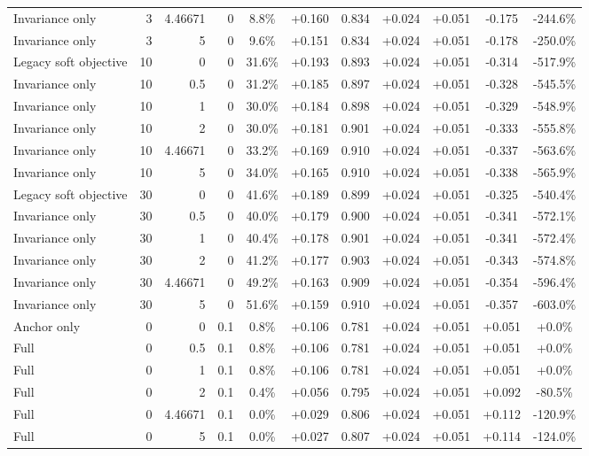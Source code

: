 \begin{table}[htbp]
\begin{tabular}{lrrrccccccc}
Invariance only & 3 & 4.46671 & 0 & 8.8\% & +0.160 & 0.834 & +0.024 & +0.051 & -0.175 & -244.6\% \\
Invariance only & 3 & 5 & 0 & 9.6\% & +0.151 & 0.834 & +0.024 & +0.051 & -0.178 & -250.0\% \\
Legacy soft objective & 10 & 0 & 0 & 31.6\% & +0.193 & 0.893 & +0.024 & +0.051 & -0.314 & -517.9\% \\
Invariance only & 10 & 0.5 & 0 & 31.2\% & +0.185 & 0.897 & +0.024 & +0.051 & -0.328 & -545.5\% \\
Invariance only & 10 & 1 & 0 & 30.0\% & +0.184 & 0.898 & +0.024 & +0.051 & -0.329 & -548.9\% \\
Invariance only & 10 & 2 & 0 & 30.0\% & +0.181 & 0.901 & +0.024 & +0.051 & -0.333 & -555.8\% \\
Invariance only & 10 & 4.46671 & 0 & 33.2\% & +0.169 & 0.910 & +0.024 & +0.051 & -0.337 & -563.6\% \\
Invariance only & 10 & 5 & 0 & 34.0\% & +0.165 & 0.910 & +0.024 & +0.051 & -0.338 & -565.9\% \\
Legacy soft objective & 30 & 0 & 0 & 41.6\% & +0.189 & 0.899 & +0.024 & +0.051 & -0.325 & -540.4\% \\
Invariance only & 30 & 0.5 & 0 & 40.0\% & +0.179 & 0.900 & +0.024 & +0.051 & -0.341 & -572.1\% \\
Invariance only & 30 & 1 & 0 & 40.4\% & +0.178 & 0.901 & +0.024 & +0.051 & -0.341 & -572.4\% \\
Invariance only & 30 & 2 & 0 & 41.2\% & +0.177 & 0.903 & +0.024 & +0.051 & -0.343 & -574.8\% \\
Invariance only & 30 & 4.46671 & 0 & 49.2\% & +0.163 & 0.909 & +0.024 & +0.051 & -0.354 & -596.4\% \\
Invariance only & 30 & 5 & 0 & 51.6\% & +0.159 & 0.910 & +0.024 & +0.051 & -0.357 & -603.0\% \\
Anchor only & 0 & 0 & 0.1 & 0.8\% & +0.106 & 0.781 & +0.024 & +0.051 & +0.051 & +0.0\% \\
Full & 0 & 0.5 & 0.1 & 0.8\% & +0.106 & 0.781 & +0.024 & +0.051 & +0.051 & +0.0\% \\
Full & 0 & 1 & 0.1 & 0.8\% & +0.106 & 0.781 & +0.024 & +0.051 & +0.051 & +0.0\% \\
Full & 0 & 2 & 0.1 & 0.4\% & +0.056 & 0.795 & +0.024 & +0.051 & +0.092 & -80.5\% \\
Full & 0 & 4.46671 & 0.1 & 0.0\% & +0.029 & 0.806 & +0.024 & +0.051 & +0.112 & -120.9\% \\
Full & 0 & 5 & 0.1 & 0.0\% & +0.027 & 0.807 & +0.024 & +0.051 & +0.114 & -124.0\% \\

\end{tabular}
\end{table}
